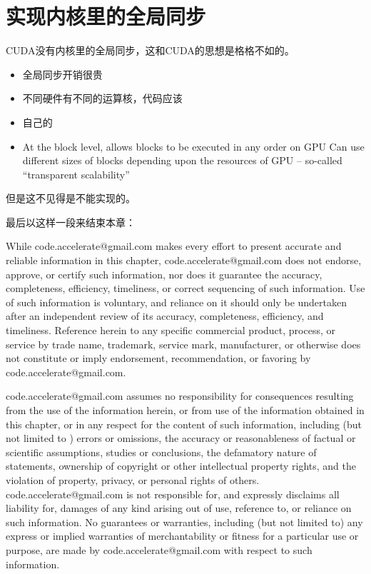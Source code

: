 \chapter{实现内核里的全局同步}

CUDA没有内核里的全局同步，这和CUDA的思想是格格不如的。
\begin{itemize}
\item 全局同步开销很贵
\item 不同硬件有不同的运算核，代码应该
\item 自己的
\item At the block level, allows blocks to be executed in any order on GPU
Can use different sizes of blocks depending upon the resources of GPU – so-called “transparent scalability”
\end{itemize}

但是这不见得是不能实现的。\cite{conf/ipps/XiaoF10}

最后以这样一段来结束本章：

While code.accelerate@gmail.com makes every effort to present accurate and reliable information in this chapter, code.accelerate@gmail.com does not endorse, approve, or certify such information, nor does it guarantee the accuracy, completeness, efficiency, timeliness, or correct sequencing of such information.   Use of such information is voluntary, and reliance on it should only be undertaken after an independent review of its accuracy, completeness, efficiency, and timeliness.  Reference herein to any specific commercial product, process, or service by trade name, trademark, service mark, manufacturer, or otherwise does not constitute or imply endorsement, recommendation, or favoring by code.accelerate@gmail.com.

code.accelerate@gmail.com assumes no responsibility for consequences resulting from the use of the information herein, or from use of the information obtained in this chapter, or in any respect for the content of such information, including (but not limited to ) errors or omissions, the accuracy or reasonableness of factual or scientific assumptions, studies or conclusions, the defamatory nature of statements, ownership of copyright or other intellectual property rights, and the violation of property, privacy, or personal rights of others.  code.accelerate@gmail.com is not responsible for, and expressly disclaims all liability for, damages of any kind arising out of use, reference to, or reliance on such information.  No guarantees or warranties, including (but not limited to) any express or implied warranties of merchantability or fitness for a particular use or purpose, are made by code.accelerate@gmail.com with respect to such information.
